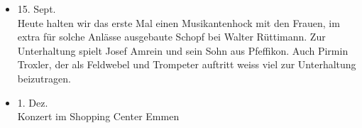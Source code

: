 \begin{history}
\begin{itemize}
        \item 15. Sept.\\
              Heute halten wir das erste Mal einen Musikantenhock mit den Frauen, im
              extra für solche Anlässe ausgebaute Schopf bei Walter Rüttimann. Zur
              Unterhaltung spielt Josef Amrein und sein Sohn aus Pfeffikon. Auch
              Pirmin Troxler, der als Feldwebel und Trompeter auftritt weiss viel zur
              Unterhaltung beizutragen.

        \item 1. Dez.\\
              Konzert im Shopping Center Emmen

    \end{itemize}

\end{history}
